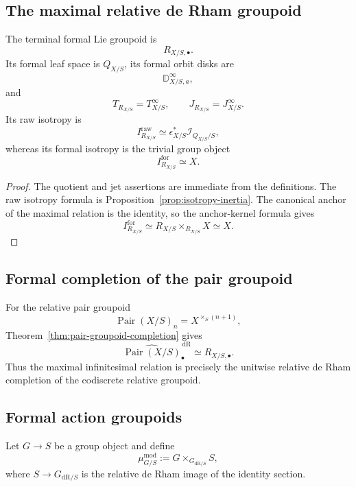\subsection{The maximal relative de Rham groupoid}

\begin{example}
The terminal formal Lie groupoid is
\[
    R_{X/S,\bullet}.
\]
Its formal leaf space is $Q_{X/S}$, its formal orbit disks are
\[
    \mathbb D^\infty_{X/S,a},
\]
and
\[
    T_{R_{X/S}}=T^\infty_{X/S},
    \qquad
    J_{R_{X/S}}=J^\infty_{X/S}.
\]
Its raw isotropy is
\[
    I^{\mathrm{raw}}_{R_{X/S}}
    \simeq
    \epsilon_{X/S}^*\mathcal I_{Q_{X/S}/S},
\]
whereas its formal isotropy is the trivial group object
\[
    I^{\mathrm{for}}_{R_{X/S}}
    \simeq X.
\]
\end{example}

\begin{proof}
The quotient and jet assertions are immediate from the definitions.  The raw
isotropy formula is
Proposition~\ref{prop:isotropy-inertia}.  The canonical anchor of the maximal
relation is the identity, so the anchor-kernel formula gives
\[
    I^{\mathrm{for}}_{R_{X/S}}
    \simeq
    R_{X/S}\times_{R_{X/S}}X
    \simeq X.
\]
\end{proof}

\subsection{Formal completion of the pair groupoid}

\begin{example}
For the relative pair groupoid
\[
    \operatorname{Pair}(X/S)_n
    =
    X^{\times_S(n+1)},
\]
Theorem~\ref{thm:pair-groupoid-completion} gives
\[
    \widehat{\operatorname{Pair}(X/S)}^{\,\mathrm{dR}}_\bullet
    \simeq
    R_{X/S,\bullet}.
\]
Thus the maximal infinitesimal relation is precisely the unitwise
relative de Rham completion of the codiscrete relative groupoid.
\end{example}

\subsection{Formal action groupoids}

Let $G\to S$ be a group object and define
\[
    \mu^{\mathrm{mod}}_{G/S}
    :=
    G\times_{G_{\mathrm{dR}/S}}S,
\]
where $S\to G_{\mathrm{dR}/S}$ is the relative de Rham image of the identity
section.

